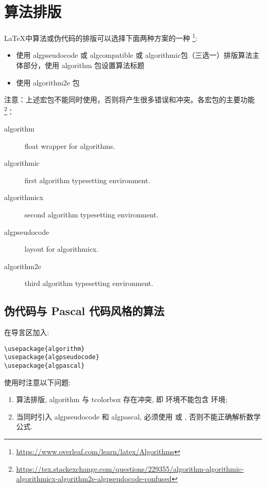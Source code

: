 \chapter{算法排版}

{\LaTeX}中算法或伪代码的排版可以选择下面两种方案的一种
\footnote{\url{https://www.overleaf.com/learn/latex/Algorithms}}:

\begin{itemize}
  \item 使用 algpseudocode 或 algcompatible 或 algorithmic包（三选一）排版算法主体部分，使用 algorithm 包设置算法标题
  \item 使用 algorithm2e 包
\end{itemize}

注意：上述宏包不能同时使用，否则将产生很多错误和冲突。各宏包的主要功能
\footnote{\url{https://tex.stackexchange.com/questions/229355/algorithm-algorithmic-algorithmicx-algorithm2e-algpseudocode-confused}}：
\begin{description}
  \item [algorithm] float wrapper for algorithms.
  \item [algorithmic] first algorithm typesetting environment.
  \item [algorithmicx] second algorithm typesetting environment.
  \item [algpseudocode] layout for algorithmicx.
  \item [algorithm2e] third algorithm typesetting environment.
\end{description}

\section{伪代码与 Pascal 代码风格的算法}

在导言区加入:
\begin{verbatim}
\usepackage{algorithm}
\usepackage{algpseudocode}
\usepackage{algpascal}
\end{verbatim}



\begin{remark*}
使用时注意以下问题:
\begin{enumerate}
  \item 算法排版, algorithm 与 tcolorbox 存在冲突, 即  环境不能包含  环境;
  \item 当同时引入 algpseudocode 和 algpascal, 必须使用  或 
  , 否则不能正确解析数学公式.
\end{enumerate}
\end{remark*}

